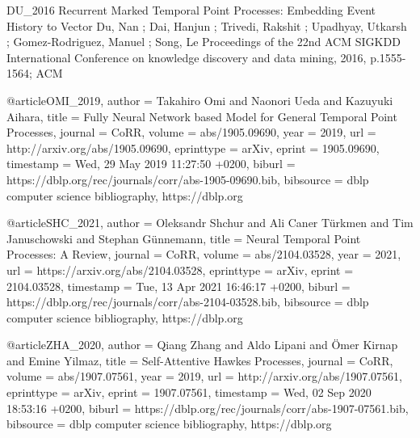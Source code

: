 DU_2016
 Recurrent Marked Temporal Point Processes: Embedding Event History to Vector
Du, Nan ; Dai, Hanjun ; Trivedi, Rakshit ; Upadhyay, Utkarsh ; Gomez-Rodriguez, Manuel ; Song, Le
Proceedings of the 22nd ACM SIGKDD International Conference on knowledge discovery and data mining, 2016, p.1555-1564; ACM

@article{OMI_2019,
  author    = {Takahiro Omi and
               Naonori Ueda and
               Kazuyuki Aihara},
  title     = {Fully Neural Network based Model for General Temporal Point Processes},
  journal   = {CoRR},
  volume    = {abs/1905.09690},
  year      = {2019},
  url       = {http://arxiv.org/abs/1905.09690},
  eprinttype = {arXiv},
  eprint    = {1905.09690},
  timestamp = {Wed, 29 May 2019 11:27:50 +0200},
  biburl    = {https://dblp.org/rec/journals/corr/abs-1905-09690.bib},
  bibsource = {dblp computer science bibliography, https://dblp.org}
}

@article{SHC_2021,
  author    = {Oleksandr Shchur and
               Ali Caner T{\"{u}}rkmen and
               Tim Januschowski and
               Stephan G{\"{u}}nnemann},
  title     = {Neural Temporal Point Processes: {A} Review},
  journal   = {CoRR},
  volume    = {abs/2104.03528},
  year      = {2021},
  url       = {https://arxiv.org/abs/2104.03528},
  eprinttype = {arXiv},
  eprint    = {2104.03528},
  timestamp = {Tue, 13 Apr 2021 16:46:17 +0200},
  biburl    = {https://dblp.org/rec/journals/corr/abs-2104-03528.bib},
  bibsource = {dblp computer science bibliography, https://dblp.org}
}

@article{ZHA_2020,
  author    = {Qiang Zhang and
               Aldo Lipani and
               {\"{O}}mer Kirnap and
               Emine Yilmaz},
  title     = {Self-Attentive Hawkes Processes},
  journal   = {CoRR},
  volume    = {abs/1907.07561},
  year      = {2019},
  url       = {http://arxiv.org/abs/1907.07561},
  eprinttype = {arXiv},
  eprint    = {1907.07561},
  timestamp = {Wed, 02 Sep 2020 18:53:16 +0200},
  biburl    = {https://dblp.org/rec/journals/corr/abs-1907-07561.bib},
  bibsource = {dblp computer science bibliography, https://dblp.org}
}